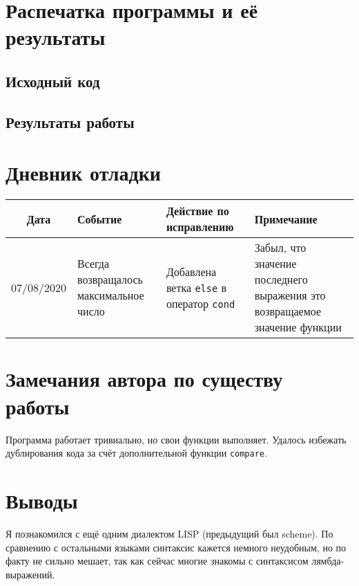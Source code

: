\documentclass[12pt]{article}
\begin{document}
\section{Распечатка программы и её результаты}

\subsection{Исходный код}

\subsection{Результаты работы}

\section{Дневник отладки}
\noindent
\begin{tabularx}{\linewidth}{|c|X|X|X|}
\hline
Дата & Событие & Действие по исправлению & Примечание \\
\hline
07/08/2020 & Всегда возвращалось максимальное число & Добавлена ветка {\tt else} в оператор {\tt cond} & Забыл, что значение последнего выражения это возвращаемое значение функции \\
\hline
\end{tabularx}

\section{Замечания автора по существу работы}
Программа работает тривиально, но свои функции выполняет. Удалось избежать дублирования кода за счёт
дополнительной функции {\tt compare}.

\section{Выводы}
Я познакомился с ещё одним диалектом LISP (предыдущий был scheme). По сравнению с остальными языками
синтаксис кажется немного неудобным, но по факту не сильно мешает, так как сейчас многие знакомы с
синтаксисом лямбда-выражений.
\end{document}
